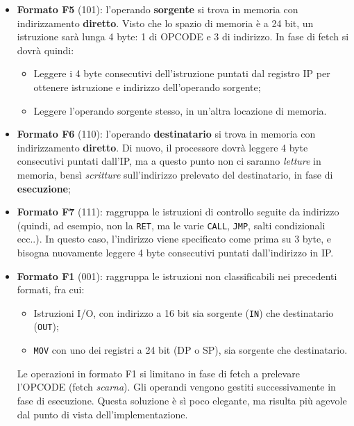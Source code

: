 \documentclass[a4paper,11pt]{article}
\begin{document}
\begin{itemize}
\item \textbf{Formato F5} (101): l'operando \textbf{sorgente} si trova in memoria con indirizzamento \textbf{diretto}.
	Visto che lo spazio di memoria è a 24 bit, un istruzione sarà lunga 4 byte: 1 di OPCODE e 3 di indirizzo.
	In fase di fetch si dovrà quindi:
	\begin{itemize}
		\item Leggere i 4 byte consecutivi dell'istruzione puntati dal registro IP per ottenere istruzione e indirizzo dell'operando sorgente;
		\item Leggere l'operando sorgente stesso, in un'altra locazione di memoria.
	\end{itemize}
\item \textbf{Formato F6} (110): l'operando \textbf{destinatario} si trova in memoria con indirizzamento \textbf{diretto}. Di nuovo, il processore dovrà leggere 4 byte consecutivi puntati dall'IP, ma a questo punto non ci saranno \textit{letture} in memoria, bensì \textit{scritture} sull'indirizzo prelevato del destinatario, in fase di \textbf{esecuzione};
\item \textbf{Formato F7} (111): raggruppa le istruzioni di controllo seguite da indirizzo (quindi, ad esempio, non la \lstinline|RET|, ma le varie \lstinline|CALL|, \lstinline|JMP|, salti condizionali ecc..).
	In questo caso, l'indirizzo viene specificato come prima su 3 byte, e bisogna nuovamente leggere 4 byte consecutivi puntati dall'indirizzo in IP.
	\item \textbf{Formato F1} (001): raggruppa le istruzioni non classificabili nei precedenti formati, fra cui:
		\begin{itemize}
			\item Istruzioni I/O, con indirizzo a 16 bit sia sorgente (\lstinline|IN|) che destinatario (\lstinline|OUT|);
			\item \lstinline|MOV| con uno dei registri a 24 bit (DP o SP), sia sorgente che destinatario.
		\end{itemize}
		Le operazioni in formato F1 si limitano in fase di fetch a prelevare l'OPCODE (fetch \textit{scarna}).
		Gli operandi vengono gestiti successivamente in fase di esecuzione.
		Questa soluzione è sì poco elegante, ma risulta più agevole dal punto di vista dell'implementazione.
\end{itemize}
\end{document}
